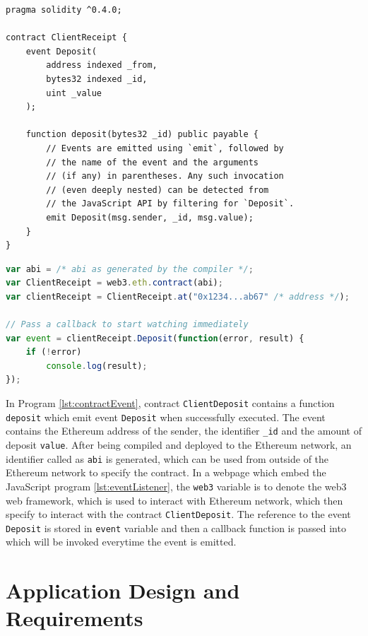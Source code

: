 \documentclass[twoside,draftfooter]{tutthesis} %
\begin{document}
\begin{lstlisting}[float,caption={Contract with Event \citep{SolidityDocumentation}.},label={lst:contractEvent},language=Solidity]
pragma solidity ^0.4.0;

contract ClientReceipt {
    event Deposit(
        address indexed _from,
        bytes32 indexed _id,
        uint _value
    );

    function deposit(bytes32 _id) public payable {
        // Events are emitted using `emit`, followed by
        // the name of the event and the arguments
        // (if any) in parentheses. Any such invocation
        // (even deeply nested) can be detected from
        // the JavaScript API by filtering for `Deposit`.
        emit Deposit(msg.sender, _id, msg.value);
    }
}
\end{lstlisting}

\begin{lstlisting}[float,caption={Listening to Event from web applications \citep{SolidityDocumentation}.},label={lst:eventListener},language=JavaScript]
var abi = /* abi as generated by the compiler */;
var ClientReceipt = web3.eth.contract(abi);
var clientReceipt = ClientReceipt.at("0x1234...ab67" /* address */);

// Pass a callback to start watching immediately
var event = clientReceipt.Deposit(function(error, result) {
    if (!error)
        console.log(result);
});
\end{lstlisting}

In Program \ref{lst:contractEvent}, contract \texttt{ClientDeposit} contains a function \texttt{deposit} which emit event \texttt{Deposit} when successfully executed. The event contains the Ethereum address of the sender, the identifier \texttt{\_id} and the amount of deposit \texttt{value}. After being compiled and deployed to the Ethereum network, an identifier called as \texttt{abi} is generated, which can be used from outside of the Ethereum network to specify the contract. In a webpage which embed the JavaScript program \ref{lst:eventListener},  the \texttt{web3} variable is to denote the web3 web framework, which is used to interact with Ethereum network, which then specify to interact with the contract \texttt{ClientDeposit}. The reference to the event \texttt{Deposit} is stored in \texttt{event} variable and then a callback function is passed into which will be invoked everytime the event is emitted.

\chapter{Application Design and Requirements}
\label{ch:ApplicationDesignAndReq}
\end{document}
